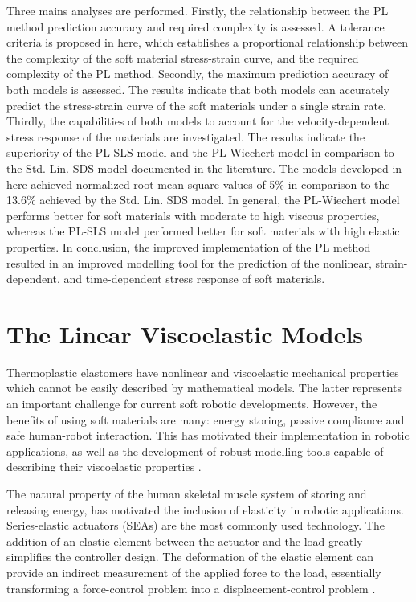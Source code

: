Three mains analyses are performed. Firstly, the relationship between the PL method prediction accuracy and required complexity is assessed. A tolerance criteria is proposed in here, which establishes a proportional relationship between the complexity of the soft material stress-strain curve, and the required complexity of the PL method. Secondly, the maximum prediction accuracy of both models is assessed. The results indicate that both models can accurately predict the stress-strain curve of the soft materials under a single strain rate. Thirdly, the capabilities of both models to account for the velocity-dependent stress response of the materials are investigated. The results indicate the superiority of the PL-SLS model and the PL-Wiechert model in comparison to the Std. Lin. SDS model documented in the literature. The models developed in here achieved normalized root mean square values of 5\% in comparison to the 13.6\% achieved by the Std. Lin. SDS model. In general, the PL-Wiechert model performs better for soft materials with moderate to high viscous properties, whereas the PL-SLS model performed better for soft materials with high elastic properties. In conclusion, the improved implementation of the PL method resulted in an improved modelling tool for the prediction of the nonlinear, strain-dependent, and time-dependent stress response of soft materials.

\section{The Linear Viscoelastic Models}

Thermoplastic elastomers have nonlinear and viscoelastic mechanical properties which cannot be easily described by mathematical models. The latter represents an important challenge for current soft robotic developments. However, the benefits of using soft materials are many: energy storing, passive compliance and safe human-robot interaction. This has motivated their implementation in robotic applications, as well as the development of robust modelling tools capable of describing their viscoelastic properties \cite{lee2017soft}.

The natural property of the human skeletal muscle system of storing and releasing energy, has motivated the inclusion of elasticity in robotic applications. Series-elastic actuators (SEAs) are the most commonly used technology. The addition of an elastic element between the actuator and the load greatly simplifies the controller design. The deformation of the elastic element can provide an indirect measurement of the applied force to the load, essentially transforming a force-control problem into a displacement-control problem \cite{agarwal2017series}. 

